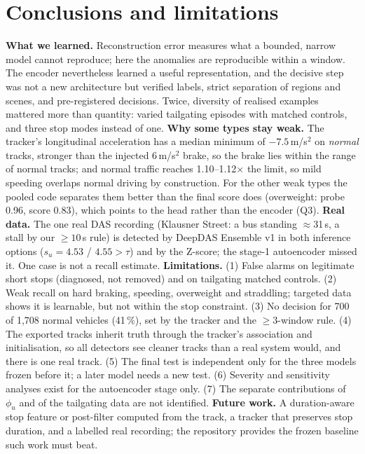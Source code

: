 \documentclass[10pt,a4paper,twocolumn]{article}
\newcommand{\EDIV}{DeepDAS Ensemble v1}\newcommand{\dev}{\textit{development}}\newcommand{\val}{\textit{validation}}\newcommand{\ft}{\textit{final test}}
\begin{document}
\section{Conclusions and limitations}\label{sec:concl}
\textbf{What we learned.} Reconstruction error measures what a bounded, narrow model cannot reproduce; here the anomalies are reproducible within a window. The encoder nevertheless learned a useful representation, and the decisive step was not a new architecture but verified labels, strict separation of regions and scenes, and pre-registered decisions. Twice, diversity of realised examples mattered more than quantity: varied tailgating episodes with matched controls, and three stop modes instead of one.
\textbf{Why some types stay weak.} The tracker's longitudinal acceleration has a median minimum of $-7.5$\,m/s$^2$ on \emph{normal} tracks, stronger than the injected 6\,m/s$^2$ brake, so the brake lies within the range of normal tracks; and normal traffic reaches 1.10--1.12$\times$ the limit, so mild speeding overlaps normal driving by construction. For the other weak types the pooled code separates them better than the final score does (overweight: probe 0.96, score 0.83), which points to the head rather than the encoder (Q3).
\textbf{Real data.} The one real DAS recording (Klausner Street: a bus standing $\approx$31\,s, a stall by our $\ge10$\,s rule) is detected by \EDIV{} in both inference options ($s_u=4.53$ / $4.55>\tau$) and by the Z-score; the stage-1 autoencoder missed it. One case is not a recall estimate.
\textbf{Limitations.} (1) False alarms on legitimate short stops (diagnosed, not removed) and on tailgating matched controls. (2) Weak recall on hard braking, speeding, overweight and straddling; targeted data shows it is learnable, but not within the stop constraint. (3) No decision for 700 of 1{,}708 normal vehicles (41\,\%), set by the tracker and the $\ge3$-window rule. (4) The exported tracks inherit truth through the tracker's association and initialisation, so all detectors see cleaner tracks than a real system would, and there is one real track. (5) The final test is independent only for the three models frozen before it; a later model needs a new test. (6) Severity and sensitivity analyses exist for the autoencoder stage only. (7) The separate contributions of $\phi_u$ and of the tailgating data are not identified.
\textbf{Future work.} A duration-aware stop feature or post-filter computed from the track, a tracker that preserves stop duration, and a labelled real recording; the repository provides the frozen baseline such work must beat.
\end{document}

